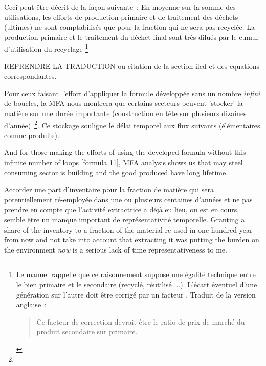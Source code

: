 {Ceci peut être décrit de la façon suivante~:
En moyenne sur la somme des utilisations, les efforts de production primaire et de traitement des déchets (ultimes) ne sont comptabilisés que pour la fraction qui ne sera pas recyclée.
La production primaire et le traitement du déchet final sont très dilués par le cumul d'utilisation du recyclage
   \footnote{
   Le manuel rappelle que ce raisonnement suppose une égalité technique entre le bien primaire et le secondaire (recyclé, réutilisé ...).
   L'écart éventuel d'une génération sur l'autre doit être corrigé par un facteur
   \cite[14.4.1.2. Annexe C : modélisation de la réutilisation, du recyclage et de la valorisation énergétique]{european_commission_ilcd_2010}.
   Traduit de la version anglaise~:
   \blockcquote{european_commission_ilcd_2010}{Ce facteur de correction devrait être le ratio de prix de marché du produit secondaire sur primaire.}
   }
   
   REPRENDRE LA TRADUCTION ou citation de la section ilcd et des equations correspondantes.
}
Pour ceux faisant l'effort d'appliquer la formule développée sans un nombre \emph{infini} de boucles, la \acrlong{MFA} nous montrera que certains secteurs peuvent 'stocker' la matière sur une durée importante (construction en tête sur plusieurs dizaines d'année)~\cite{davis_time-dependent_2007}\footnote{}.
Ce stockage souligne le délai temporel aux flux suivants (élémentaires comme produits).

And for those making the efforts of using the developed formula without this infinite number of loops [formula 11], MFA analysis shows us that may steel consuming sector is building and the good produced have long lifetime.

Accorder une part d'inventaire pour la fraction de matière qui sera potentiellement ré-employée dans une ou plusieurs centaines d'années et ne pas prendre en compte que l'activité extractrice a déjà eu lieu, ou est en cours, semble être un manque important de représentativité temporelle.
Granting a share of the inventory to a fraction of the material re-used in one hundred year from now and not take into account that extracting it was putting the burden on the environment \emph{now} is a serious lack of time representativeness to me.

